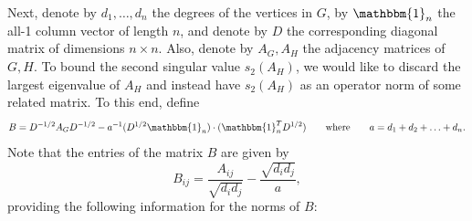 \documentclass[reqno,a4paper]{amsart}
\theoremstyle{definition}
\begin{document}
Next, denote by $d_1,\ldots,d_n$ the degrees of the vertices in $G$, 
by $\mathbbm{1}_n$ the all-1 column vector of length $n$, 
and denote by $D$ the corresponding diagonal matrix of dimensions $n\times n$. Also, denote by $A_G,A_H$ the adjacency matrices of $G,H$.
To bound the second singular value $s_2(A_H)$, we would like to discard the largest eigenvalue of $A_H$ and instead have $s_2(A_H)$ as an operator norm of some related matrix. 
To this end, define
\begin{equation*}
B=D^{-1/2}A_GD^{-1/2}-a^{-1} (D^{1/2}\mathbbm{1}_n)\cdot (\mathbbm{1}_n^T D^{1/2})
        \qquad\text{where}\qquad
        a=d_1+d_2+\ldots+d_n.
\end{equation*}
Note that the entries of the matrix $B$ are given by
\begin{equation}\label{eq:B}
B_{ij} = \frac{A_{ij}}{\sqrt{d_i d_j}} - \frac{\sqrt{d_i d_j}}{a},
\end{equation}
providing the following information for the norms of $B$:
\end{document}
